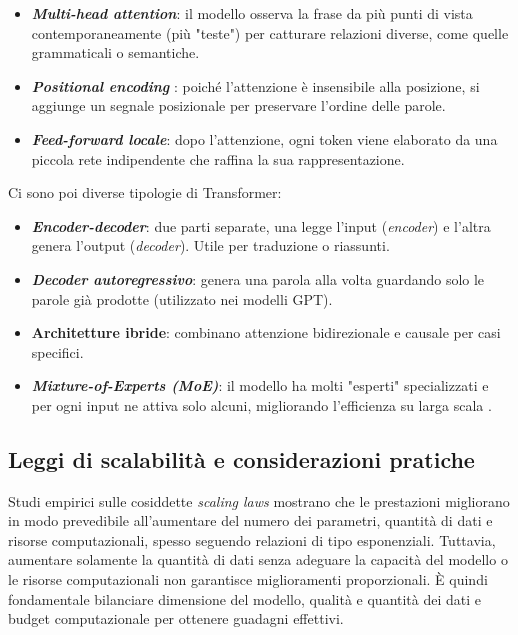 \begin{itemize}
    \item \textbf{\textit{Multi-head attention}}: il modello osserva la frase da più punti di vista contemporaneamente (più "teste") per catturare relazioni diverse, come quelle grammaticali o semantiche.
    \item \textbf{\textit{Positional encoding}} \cite{vaswani2017attention}: poiché l'attenzione è insensibile alla posizione, si aggiunge un segnale posizionale per preservare l'ordine delle parole.
    \item \textbf{\textit{Feed-forward locale}}: dopo l'attenzione, ogni token viene elaborato da una piccola rete indipendente che raffina la sua rappresentazione.
\end{itemize}

Ci sono poi diverse tipologie di Transformer:
\begin{itemize}
    \item \textbf{\textit{Encoder-decoder}}: due parti separate, una legge l'input (\textit{encoder}) e l'altra genera l'output (\textit{decoder}). Utile per traduzione o riassunti.
    \item \textbf{\textit{Decoder autoregressivo}}: genera una parola alla volta guardando solo le parole già prodotte (utilizzato nei modelli GPT).
    \item \textbf{Architetture ibride}: combinano attenzione bidirezionale e causale per casi specifici.
    \item \textbf{\textit{Mixture-of-Experts (MoE)}}: il modello ha molti "esperti" specializzati e per ogni input ne attiva solo alcuni, 
    migliorando l'efficienza su larga scala \cite{fedus2022switch}\cite{du2022glam}\cite{ren2023pangu-p}.
\end{itemize}

\subsection{Leggi di scalabilità e considerazioni pratiche}
Studi empirici sulle cosiddette \textit{scaling laws} mostrano che le prestazioni migliorano in modo prevedibile all'aumentare del numero dei parametri, 
quantità di dati e risorse computazionali, spesso seguendo relazioni di tipo esponenziali. Tuttavia, aumentare solamente la quantità di dati 
senza adeguare la capacità del modello o le risorse computazionali non garantisce miglioramenti proporzionali. È quindi fondamentale bilanciare dimensione del modello, 
qualità e quantità dei dati e budget computazionale per ottenere guadagni effettivi. \cite{hoffmann2022training} \cite{kaplan2020scaling}

